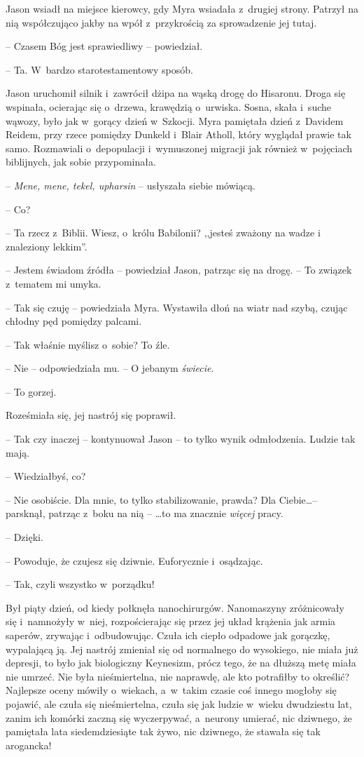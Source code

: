 \documentclass[oneside,polish,11pt,sfheadings]{mwbk}
\let\footnote=\endnote
\begin{document}
Jason wsiadł na miejsce kierowcy, gdy Myra wsiadała z~drugiej strony.
Patrzył na nią współczująco jakby na wpół z~przykrością za sprowadzenie
jej tutaj.

-- Czasem Bóg jest sprawiedliwy -- powiedział.

-- Ta. W~bardzo starotestamentowy sposób.

Jason uruchomił silnik i~zawrócił dżipa na wąską drogę do Hisaronu.
Droga się wspinała, ocierając się o~drzewa, krawędzią o~urwiska. Sosna,
skała i~suche wąwozy, było jak w~gorący dzień w~Szkocji. Myra pamiętała
dzień z~Davidem Reidem, przy rzece pomiędzy Dunkeld i~Blair Atholl,
który wyglądał prawie tak samo. Rozmawiali o~depopulacji i~wymuszonej
migracji jak również w~pojęciach biblijnych, jak sobie przypominała.

-- \textit{Mene, mene, tekel, upharsin} -- usłyszała siebie mówiącą.

-- Co?

-- Ta rzecz z~Biblii. Wiesz, o~królu Babilonii? ,,jesteś zważony na wadze
i znaleziony lekkim''\footnote{ cyt. z~księgi Daniel 5,27 Biblia Brytyjska -- przyp.tłum.}.

-- Jestem świadom źródła -- powiedział Jason, patrząc się na drogę. -- To
związek z~tematem mi umyka.

-- Tak się czuję -- powiedziała Myra. Wystawiła dłoń na wiatr nad szybą,
czując chłodny pęd pomiędzy palcami.

-- Tak właśnie myślisz o~sobie? To źle.

-- Nie -- odpowiedziała mu. -- O jebanym \textit{świecie}.

-- To gorzej.

Roześmiała się, jej nastrój się poprawił.

-- Tak czy inaczej -- kontynuował Jason -- to tylko wynik odmłodzenia.
Ludzie tak mają.

-- Wiedziałbyś, co?

-- Nie osobiście. Dla mnie, to tylko stabilizowanie, prawda? Dla
Ciebie\ldots -- parsknął, patrząc z~boku na nią -- \ldots to ma znacznie
\textit{więcej} pracy.

-- Dzięki.

-- Powoduje, że czujesz się dziwnie. Euforycznie i~osądzając.

-- Tak, czyli wszystko w~porządku!

Był piąty dzień, od kiedy połknęła nanochirurgów. Nanomaszyny zróżnicowały
się i~namnożyły w~niej, rozpościerając się przez jej układ krążenia jak
armia saperów, zrywając i~odbudowując. Czuła ich ciepło odpadowe jak
gorączkę, wypalającą ją. Jej nastrój zmieniał się od normalnego do
wysokiego, nie miała już depresji, to było jak biologiczny Keynesizm,
prócz tego, że na dłuższą metę miała nie umrzeć. Nie była nieśmiertelna,
nie naprawdę, ale kto potrafiłby to określić? Najlepsze oceny mówiły o~wiekach, a~w~takim czasie coś innego mogłoby się pojawić, ale czuła się
nieśmiertelna, czuła się jak ludzie w~wieku dwudziestu lat, zanim ich
komórki zaczną się wyczerpywać, a~neurony umierać, nic dziwnego, że
pamiętała lata siedemdziesiąte tak żywo, nic dziwnego, że stawała się
tak arogancka!
\end{document}
